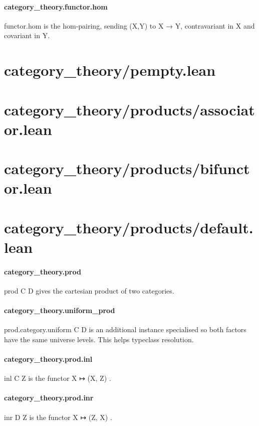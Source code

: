 \documentclass{article}
\begin{document}
\paragraph{category\_theory.functor.hom}
\par
\colorbox[RGB]{253,246,227}{{{{\color[RGB]{101, 123, 131} functor.hom }}}} is the hom-pairing, sending (X,Y) to X → Y, contravariant in X and covariant in Y.
\section{category\_theory/pempty.lean}\section{category\_theory/products/associator.lean}\section{category\_theory/products/bifunctor.lean}\section{category\_theory/products/default.lean}\paragraph{category\_theory.prod}
\par
\colorbox[RGB]{253,246,227}{{{{\color[RGB]{101, 123, 131} prod C D }}}} gives the cartesian product of two categories.
\paragraph{category\_theory.uniform\_prod}
\par
\colorbox[RGB]{253,246,227}{{{{\color[RGB]{101, 123, 131} prod.category.uniform C D }}}} is an additional instance specialised so both factors have the same universe levels. This helps typeclass resolution.
\paragraph{category\_theory.prod.inl}
\par
\colorbox[RGB]{253,246,227}{{{{\color[RGB]{101, 123, 131} inl C Z }}}} is the functor 
\colorbox[RGB]{253,246,227}{{{{\color[RGB]{101, 123, 131} X ↦ (X, Z) }}}}.
\paragraph{category\_theory.prod.inr}
\par
\colorbox[RGB]{253,246,227}{{{{\color[RGB]{101, 123, 131} inr D Z }}}} is the functor 
\colorbox[RGB]{253,246,227}{{{{\color[RGB]{101, 123, 131} X ↦ (Z, X) }}}}.
\end{document}
